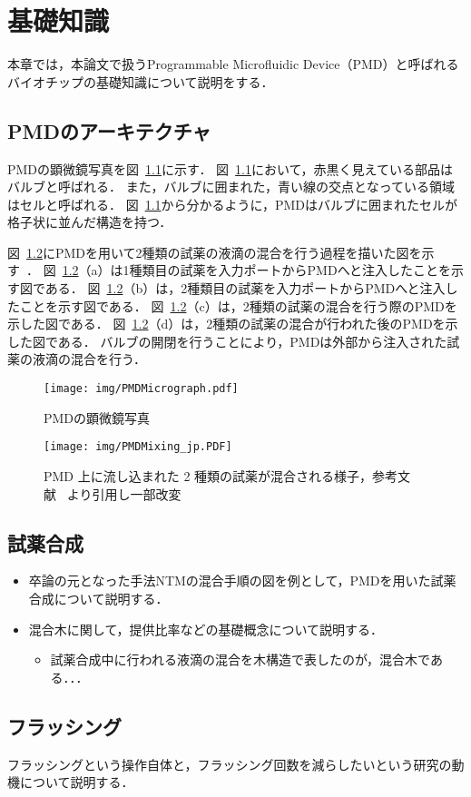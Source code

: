 \chapter{基礎知識}
本章では，本論文で扱うProgrammable Microfluidic Device（PMD）と呼ばれるバイオチップの基礎知識について説明をする．

\section{PMDのアーキテクチャ}
PMDの顕微鏡写真を図~\ref{fig:PMDMicrograph}に示す．
図~\ref{fig:PMDMicrograph}において，赤黒く見えている部品はバルブと呼ばれる．
また，バルブに囲まれた，青い線の交点となっている領域はセルと呼ばれる．
図~\ref{fig:PMDMicrograph}から分かるように，PMDはバルブに囲まれたセルが格子状に並んだ構造を持つ．

図~\ref{fig:MixingOnPMD}にPMDを用いて2種類の試薬の液滴の混合を行う過程を描いた図を示す~\cite{4}．
図~\ref{fig:MixingOnPMD}（a）は1種類目の試薬を入力ポートからPMDへと注入したことを示す図である．
図~\ref{fig:MixingOnPMD}（b）は，2種類目の試薬を入力ポートからPMDへと注入したことを示す図である．
図~\ref{fig:MixingOnPMD}（c）は，2種類の試薬の混合を行う際のPMDを示した図である．
図~\ref{fig:MixingOnPMD}（d）は，2種類の試薬の混合が行われた後のPMDを示した図である．
バルブの開閉を行うことにより，PMDは外部から注入された試薬の液滴の混合を行う．

\begin{figure}[tbp]
 \centering\texttt{[image: img/PMDMicrograph.pdf]}
 \caption{PMDの顕微鏡写真}\label{fig:PMDMicrograph}
\end{figure}

\begin{figure}[tbp]
    \centering\texttt{[image: img/PMDMixing\_jp.PDF]}
    \caption{PMD 上に流し込まれた 2 種類の試薬が混合される様子，参考文献~\cite{4} より引用し一部改変}\label{fig:MixingOnPMD}
\end{figure}
\section{試薬合成}
\begin{itemize}
\item 卒論の元となった手法NTMの混合手順の図を例として，PMDを用いた試薬合成について説明する．
\item 混合木に関して，提供比率などの基礎概念について説明する．
\begin{itemize}
\item 試薬合成中に行われる液滴の混合を木構造で表したのが，混合木である．．．
\end{itemize} 
\end{itemize} 
\section{フラッシング}
フラッシングという操作自体と，フラッシング回数を減らしたいという研究の動機について説明する．
 
